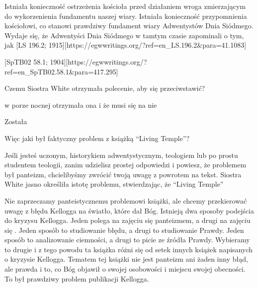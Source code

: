 Istniała konieczność ostrzeżenia kościoła przed działaniem wroga zmierzającym do wykorzenienia fundamentu naszej wiary. Istniała konieczność przypomnienia kościołowi, co stanowi prawdziwy fundament wiary Adwentystów Dnia Siódmego. Wydaje się, że Adwentyści Dnia Siódmego w tamtym czasie zapominali o tym, jak [LS 196.2; 1915][https://egwwritings.org/?ref=en\_LS.196.2&para=41.1083]


[SpTB02 58.1; 1904][https://egwwritings.org/?ref=en\_SpTB02.58.1&para=417.295]


Czemu Siostra White otrzymała polecenie, aby się przeciwstawić?


 w porze nocnej  otrzymała ona i że musi się na nie  

Została 


Więc jaki był faktyczny problem z książką “Living Temple”?


Jeśli jesteś uczonym, historykiem adwentystycznym, teologiem lub po prostu studentem teologii, zanim udzielisz prostej odpowiedzi i powiesz, że problemem był panteizm, chcielibyśmy zwrócić twoją uwagę z powrotem na tekst. Siostra White jasno określiła istotę problemu, stwierdzając, że “Living Temple” 


Nie zaprzeczamy panteistycznemu problemowi książki, ale chcemy przekierować uwagę z błędu Kellogga na światło, które dał Bóg. Istnieją dwa sposoby podejścia do kryzysu Kellogga. Jeden polega na zajęciu się panteizmem, a drugi na zajęciu się . Jeden sposób to studiowanie błędu, a drugi to studiowanie Prawdy. Jeden sposób to analizowanie ciemności, a drugi to picie ze źródła Prawdy. Wybieramy to drugie i z tego powodu ta książka różni się od setek innych książek napisanych o kryzysie Kellogga. Tematem tej książki nie jest panteizm ani żaden inny błąd, ale prawda i to, co Bóg objawił o swojej osobowości i miejscu swojej obecności. To był prawdziwy problem publikacji Kellogga.

